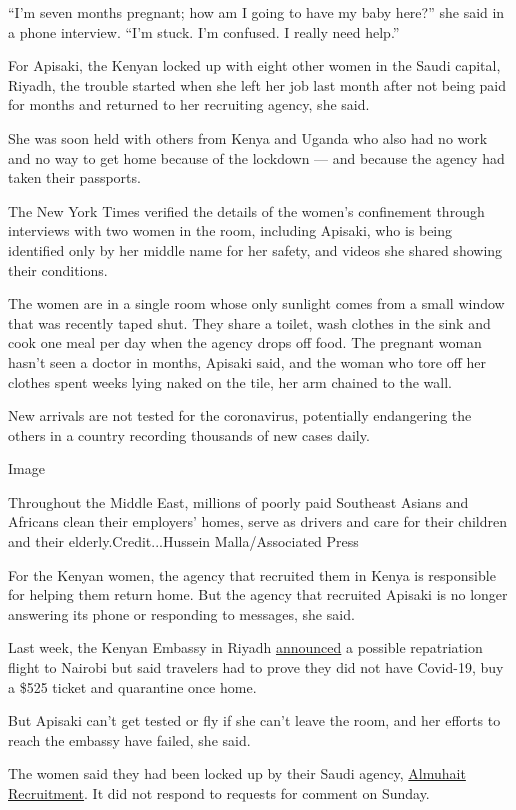 ``I'm seven months pregnant; how am I going to have my baby here?'' she
said in a phone interview. ``I'm stuck. I'm confused. I really need
help.''

For Apisaki, the Kenyan locked up with eight other women in the Saudi
capital, Riyadh, the trouble started when she left her job last month
after not being paid for months and returned to her recruiting agency,
she said.

She was soon held with others from Kenya and Uganda who also had no work
and no way to get home because of the lockdown --- and because the
agency had taken their passports.

The New York Times verified the details of the women's confinement
through interviews with two women in the room, including Apisaki, who is
being identified only by her middle name for her safety, and videos she
shared showing their conditions.

The women are in a single room whose only sunlight comes from a small
window that was recently taped shut. They share a toilet, wash clothes
in the sink and cook one meal per day when the agency drops off food.
The pregnant woman hasn't seen a doctor in months, Apisaki said, and the
woman who tore off her clothes spent weeks lying naked on the tile, her
arm chained to the wall.

New arrivals are not tested for the coronavirus, potentially endangering
the others in a country recording thousands of new cases daily.

Image

Throughout the Middle East, millions of poorly paid Southeast Asians and
Africans clean their employers' homes, serve as drivers and care for
their children and their elderly.Credit...Hussein Malla/Associated Press

For the Kenyan women, the agency that recruited them in Kenya is
responsible for helping them return home. But the agency that recruited
Apisaki is no longer answering its phone or responding to messages, she
said.

Last week, the Kenyan Embassy in Riyadh
\href{https://twitter.com/KenyaRiyadh/status/1277911187724828673}{announced}
a possible repatriation flight to Nairobi but said travelers had to
prove they did not have Covid-19, buy a \$525 ticket and quarantine once
home.

But Apisaki can't get tested or fly if she can't leave the room, and her
efforts to reach the embassy have failed, she said.

The women said they had been locked up by their Saudi agency,
\href{https://www.facebook.com/\%D9\%85\%D9\%83\%D8\%AA\%D8\%A8-\%D8\%A7\%D9\%84\%D9\%85\%D8\%AD\%D9\%8A\%D8\%B7-\%D9\%84\%D9\%84\%D8\%A7\%D8\%B3\%D8\%AA\%D9\%82\%D8\%AF\%D8\%A7\%D9\%85-103491741091774/?ref=nf\&hc_ref=ARSq4vc8q4S5QfycNQXadsjq_HLexcYyzaiFQZAKq_cXIDFfzK1uEecA1F1fnZyolcM}{Almuhait
Recruitment}. It did not respond to requests for comment on Sunday.

